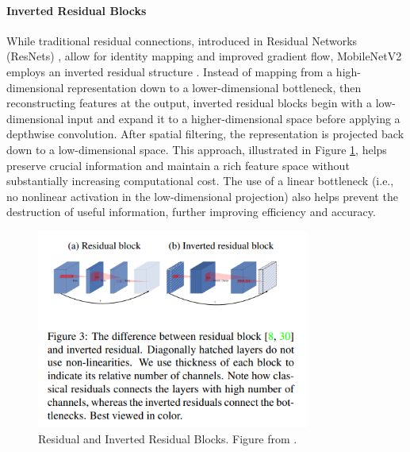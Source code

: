\paragraph{Inverted Residual Blocks}
While traditional residual connections, introduced in Residual Networks (ResNets) \cite{he2016} , allow for identity mapping and improved gradient flow, MobileNetV2 employs an inverted residual structure \cite{sandler2018mobilenetv2}. Instead of mapping from a high-dimensional representation down to a lower-dimensional bottleneck, then reconstructing features at the output, inverted residual blocks begin with a low-dimensional input and expand it to a higher-dimensional space before applying a depthwise convolution. After spatial filtering, the representation is projected back down to a low-dimensional space. This approach, illustrated in Figure \ref{fig:residual}, helps preserve crucial information and maintain a rich feature space without substantially increasing computational cost. The use of a linear bottleneck (i.e., no nonlinear activation in the low-dimensional projection) also helps prevent the destruction of useful information, further improving efficiency and accuracy.  

\begin{figure}[ht]
    \centering
    \includegraphics[width=0.8\textwidth]{Images/inverted_residual.png} 
    \caption{Residual and Inverted Residual Blocks. Figure from \cite{sandler2018mobilenetv2}. }
    \label{fig:residual}
\end{figure}

